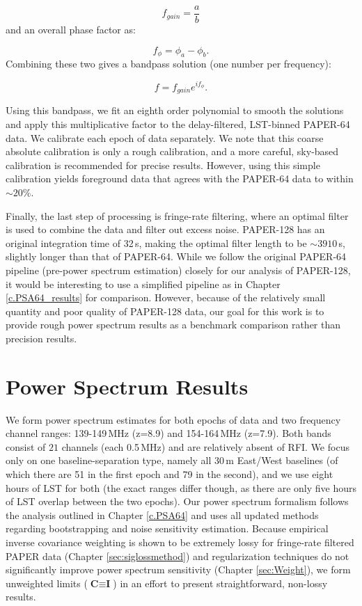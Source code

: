 \begin{equation}
f_{gain} = \frac{a}{b}
\end{equation}
and an overall phase factor as:

\begin{equation}
f_{\phi} = \phi_{a} - \phi_{b}.
\end{equation}
Combining these two gives a bandpass solution (one number per frequency):

\begin{equation}
f = f_{gain}e^{if_{\phi}}.
\end{equation}

Using this bandpass, we fit an eighth order polynomial to smooth the solutions and apply this multiplicative factor to the delay-filtered, LST-binned PAPER-64 data. We calibrate each epoch of data separately. We note that this coarse absolute calibration is only a rough calibration, and a more careful, sky-based calibration is recommended for precise results. However, using this simple calibration yields foreground data that agrees with the PAPER-64 data to within $\sim20\%$.

Finally, the last step of processing is fringe-rate filtering, where an optimal filter is used to combine the data and filter out excess noise. PAPER-128 has an original integration time of 32\,s, making the optimal filter length to be $\sim3910$\,s, slightly longer than that of PAPER-64. While we follow the original PAPER-64 pipeline (pre-power spectrum estimation) closely for our analysis of PAPER-128, it would be interesting to use a simplified pipeline as in Chapter \ref{c.PSA64_results} for comparison. However, because of the relatively small quantity and poor quality of PAPER-128 data, our goal for this work is to provide rough power spectrum results as a benchmark comparison rather than precision results. 

\section{Power Spectrum Results}

We form power spectrum estimates for both epochs of data and two frequency channel ranges: 139-149\,MHz (z=8.9) and 154-164\,MHz (z=7.9). Both bands consist of $21$ channels (each 0.5\,MHz) and are relatively absent of RFI. We focus only on one baseline-separation type, namely all 30\,m East/West baselines (of which there are 51 in the first epoch and 79 in the second), and we use eight hours of LST for both (the exact ranges differ though, as there are only five hours of LST overlap between the two epochs). Our power spectrum formalism follows the analysis outlined in Chapter \ref{c.PSA64} and uses all updated methods regarding bootstrapping and noise sensitivity estimation. Because empirical inverse covariance weighting is shown to be extremely lossy for fringe-rate filtered PAPER data (Chapter \ref{sec:siglossmethod}) and regularization techniques do not significantly improve power spectrum sensitivity (Chapter \ref{sec:Weight}), we form unweighted limits ($\textbf{C} \equiv \textbf{I}$) in an effort to present straightforward, non-lossy results.

